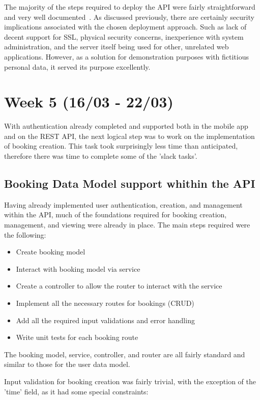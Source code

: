 The majority of the steps required to deploy the API were fairly straightforward and very well documented~\cite{deployment_tutorial_ref}. As discussed previously, there are certainly security implications associated with the chosen deployment approach. Such as lack of decent support for SSL, physical security concerns, inexperience with system administration, and the server itself being used for other, unrelated web applications. However, as a solution for demonstration purposes with fictitious personal data, it served its purpose excellently.

\section{Week 5 (16/03 - 22/03)}
With authentication already completed and supported both in the mobile app and on the REST API, the next logical step was to work on the implementation of booking creation. This task took surprisingly less time than anticipated, therefore there was time to complete some of the 'slack tasks'.

\subsection{Booking Data Model support whithin the API}
Having already implemented user authentication, creation, and management within the API, much of the foundations required for booking creation, management, and viewing were already in place. The main steps required were the following:

\begin{itemize}
	\item Create booking model
	\item Interact with booking model via service
	\item Create a controller to allow the router to interact with the service
	\item Implement all the necessary routes for bookings (CRUD)
	\item Add all the required input validations and error handling
	\item Write unit tests for each booking route
\end{itemize}

The booking model, service, controller, and router are all fairly standard and similar to those for the user data model. 

Input validation for booking creation was fairly trivial, with the exception of the 'time' field, as it had some special constraints:

